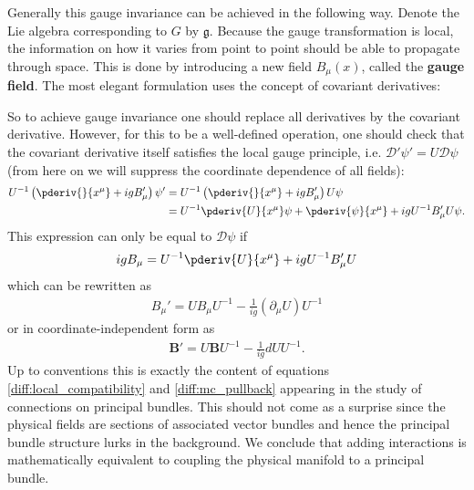     Generally this gauge invariance can be achieved in the following way. Denote the Lie algebra corresponding to $G$ by $\mathfrak{g}$. Because the gauge transformation is local, the information on how it varies from point to point should be able to propagate through space. This is done by introducing a new field $B_\mu(x)$, called the \textbf{gauge field}. The most elegant formulation uses the concept of covariant derivatives:

    So to achieve gauge invariance one should replace all derivatives by the covariant derivative. However, for this to be a well-defined operation, one should check that the covariant derivative itself satisfies the local gauge principle, i.e. $\mathcal{D}'\psi' = U\mathcal{D}\psi$ (from here on we will suppress the coordinate dependence of all fields):
    \begin{align}
        U^{-1}\left(\pderiv{}{x^\mu} + igB_\mu'\right)\psi' &= U^{-1}\left(\pderiv{}{x^\mu} + igB_\mu'\right)U\psi\nonumber\\
        &= U^{-1}\pderiv{U}{x^\mu}\psi + \pderiv{\psi}{x^\mu} + igU^{-1}B_\mu'U\psi.
    \end{align}
    This expression can only be equal to $\mathcal{D}\psi$ if
    \begin{gather}
        igB_\mu = U^{-1}\pderiv{U}{x^\mu} + igU^{-1}B_\mu'U
    \end{gather}
    which can be rewritten as
    \begin{gather}
        B_\mu' = UB_\mu U^{-1} - \frac{1}{ig}(\partial_\mu U)U^{-1}
    \end{gather}
    or in coordinate-independent form as
    \begin{gather}
        \mathbf{B}' = U\mathbf{B}U^{-1} - \frac{1}{ig}dUU^{-1}.
    \end{gather}
    Up to conventions this is exactly the content of equations \ref{diff:local_compatibility} and \ref{diff:mc_pullback} appearing in the study of connections on principal bundles. This should not come as a surprise since the physical fields are sections of associated vector bundles and hence the principal bundle structure lurks in the background. We conclude that adding interactions is mathematically equivalent to coupling the physical manifold to a principal bundle.

